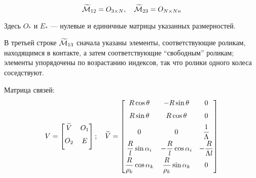 $$
\widetilde{\mathcal{M}}_{12} = O_{3 \times N},
\quad
\widetilde{\mathcal{M}}_{23} = O_{N \times Nn}
$$

Здесь $O_*$ и $E_*$ --- нулевые и единичные матрицы указанных размерностей.

В третьей строке $\widetilde{\mathcal{M}}_{13}$ сначала указаны элементы, соответствующие роликам, находящимся в контакте, а затем соответствующие ``свободным'' роликам; элементы упорядочены по возрастанию индексов, так что ролики одного колеса соседствуют.

Матрица связей:
$$
V = \begin{bmatrix}
        \widetilde{V}  & O_1  \\[6pt]
        O_2       & E         \\[6pt]
    \end{bmatrix};
\quad
\widetilde{V} = \begin{bmatrix}
        R\cos\theta                    & -R\sin\theta                    & 0                      \\[6pt]
        R\sin\theta                    &  R\cos\theta                    & 0                      \\[6pt]
        0                              & 0                               & \displaystyle\frac{\displaystyle 1}{\displaystyle \Lambda}    \\[6pt]
        \displaystyle\frac{\displaystyle R}{\displaystyle l}\sin\alpha_i      & -\displaystyle\frac{\displaystyle R}{\displaystyle l}\cos\alpha_i      & -\displaystyle\frac{\displaystyle R}{\displaystyle \Lambda l} \\[6pt]
        \displaystyle\frac{\displaystyle R}{\displaystyle \rho_k}\cos\alpha_k &  \displaystyle\frac{\displaystyle R}{\displaystyle \rho_k}\sin\alpha_k & 0                      \\[6pt]
    \end{bmatrix}
$$

